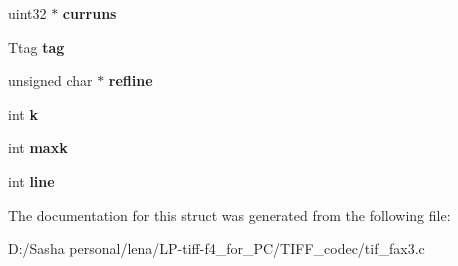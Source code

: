 \begin{DoxyCompactItemize}
\item 
\hypertarget{struct_fax3_codec_state_a108e98aa2565867a86012dc99a3dd425}{}uint32 $\ast$ {\bfseries curruns}\label{struct_fax3_codec_state_a108e98aa2565867a86012dc99a3dd425}

\item 
\hypertarget{struct_fax3_codec_state_a76596b7fab6dd303e4b8bca0d3bc7946}{}Ttag {\bfseries tag}\label{struct_fax3_codec_state_a76596b7fab6dd303e4b8bca0d3bc7946}

\item 
\hypertarget{struct_fax3_codec_state_ac6fb4127b28d6a3bc6b3155943100dda}{}unsigned char $\ast$ {\bfseries refline}\label{struct_fax3_codec_state_ac6fb4127b28d6a3bc6b3155943100dda}

\item 
\hypertarget{struct_fax3_codec_state_ab66ed8e0098c0a86b458672a55a9cca9}{}int {\bfseries k}\label{struct_fax3_codec_state_ab66ed8e0098c0a86b458672a55a9cca9}

\item 
\hypertarget{struct_fax3_codec_state_a67db1e9724563e04a579f4a083d950a2}{}int {\bfseries maxk}\label{struct_fax3_codec_state_a67db1e9724563e04a579f4a083d950a2}

\item 
\hypertarget{struct_fax3_codec_state_a41ebd28ef1d7c6ade45642cb6acc1039}{}int {\bfseries line}\label{struct_fax3_codec_state_a41ebd28ef1d7c6ade45642cb6acc1039}

\end{DoxyCompactItemize}


The documentation for this struct was generated from the following file\+:\begin{DoxyCompactItemize}
\item 
D\+:/\+Sasha personal/lena/\+L\+P-\/tiff-\/f4\+\_\+for\+\_\+\+P\+C/\+T\+I\+F\+F\+\_\+codec/tif\+\_\+fax3.\+c\end{DoxyCompactItemize}
